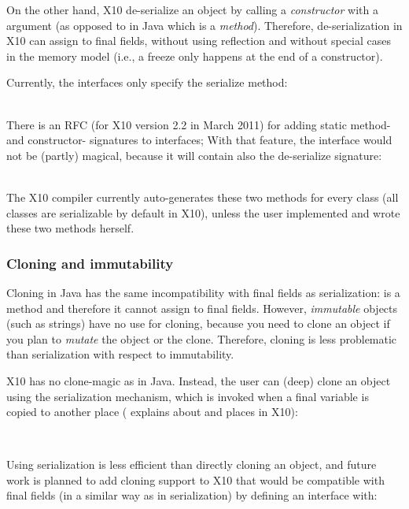 On the other hand, X10 de-serialize an object by calling a \emph{constructor} with a 
    argument (as opposed to  in Java which is a \emph{method}).
Therefore, de-serialization in X10 can assign to final fields, without using reflection
    and without special cases in the memory model (i.e., a freeze only happens at the end of a constructor).

Currently, the  interfaces only specify the serialize method:

~~~~~~~~\\
There is an RFC (for X10 version 2.2 in March 2011) for adding static method- and constructor- signatures to interfaces;
    With that feature, the  interface would not be (partly) magical,
    because it will contain also the de-serialize signature:

~~~~~~~~\\
The X10 compiler currently auto-generates these two methods for every class (all classes are serializable by default in X10),
    unless the user implemented  and wrote these two methods herself.

\subsubsection{Cloning and immutability}
\label{Section:Cloning}
Cloning in Java has the same incompatibility with final fields as serialization:
     is a method and therefore it cannot assign to final fields.
However, \emph{immutable} objects (such as strings) have no use for cloning,
    because you need to clone an object if you plan to \emph{mutate} the object or the clone.
Therefore, cloning is less problematic than serialization with respect to immutability.

X10 has no clone-magic as in Java.
Instead, the user can (deep) clone an object using the serialization mechanism,
    which is invoked when a final variable is copied to another place
    ( explains about  and places in X10):

~~~~~~~~

Using serialization is less efficient than directly cloning an object,
    and future work is planned to add cloning support to X10
    that would be compatible with final fields
    (in a similar way as in serialization) by defining an interface  with:

